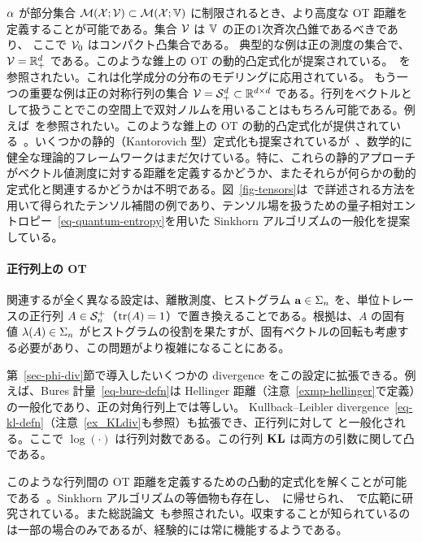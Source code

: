 $\alpha$ が部分集合 $\mathcal{M}(\mathcal{X};\mathcal{V}) \subset \mathcal{M}(\mathcal{X};\mathbb{V})$ に制限されるとき、より高度な OT 距離を定義することが可能である。集合 $\mathcal{V}$ は $\mathbb{V}$ の正の1次斉次凸錐であるべきであり、
ここで $\mathcal{V}_0$ はコンパクト凸集合である。
典型的な例は正の測度の集合で、$\mathcal{V}=\mathbb{R}_+^d$ である。このような錐上の OT の動的凸定式化が提案されている。~\citep{MatthesPositive}を参照されたい。これは化学成分の分布のモデリングに応用されている。
もう一つの重要な例は正の対称行列の集合 $\mathcal{V}=\mathcal{S}_+^d \subset \mathbb{R}^{d \times d}$ である。行列をベクトルとして扱うことでこの空間上で双対ノルムを用いることはもちろん可能である。例えば~\citep{Ning2014metrics}を参照されたい。このような錐上の OT の動的凸定式化が提供されている~\citep{Chen2016,JiangSpectral}。いくつかの静的（Kantorovich 型）定式化も提案されているが~\citep{ning2015matrix,2016-peyre-qot}、数学的に健全な理論的フレームワークはまだ欠けている。特に、これらの静的アプローチがベクトル値測度に対する距離を定義するかどうか、またそれらが何らかの動的定式化と関連するかどうかは不明である。図~\ref{fig-tensors}は~\citep{2016-peyre-qot}で詳述される方法を用いて得られたテンソル補間の例であり、テンソル場を扱うための量子相対エントロピー~\eqref{eq-quantum-entropy}を用いた Sinkhorn アルゴリズムの一般化を提案している。

\paragraph{正行列上の OT}

関連するが全く異なる設定は、離散測度、\ie ヒストグラム $\mathrm{\textbf{a}} \in \Sigma_n$ を、単位トレースの正行列 $A \in \mathcal{S}_n^+$（$\operatorname{tr}(A)=1$）で置き換えることである。根拠は、$A$ の固有値 $\lambda(A) \in \Sigma_n$ がヒストグラムの役割を果たすが、固有ベクトルの回転も考慮する必要があり、この問題がより複雑になることにある。

第~\ref{sec-phi-div}節で導入したいくつかの divergence をこの設定に拡張できる。例えば、Bures 計量~\eqref{eq-bure-defn}は Hellinger 距離（注意~\ref{exmp-hellinger}で定義）の一般化であり、正の対角行列上では等しい。
Kullback--Leibler divergence~\eqref{eq-kl-defn}（注意~\ref{ex_KLdiv}も参照）も拡張でき、正行列に対して
と一般化される。ここで $\log(\cdot)$ は行列対数である。この行列 $\mathrm{\textbf{KL}}$ は両方の引数に関して凸である。

このような行列間の OT 距離を定義するための凸動的定式化を解くことが可能である~\citep{Carlen2014,Chen2016,ChenGangbo17}。Sinkhorn アルゴリズムの等価物も存在し、~\citet{gurvits2004classical}に帰せられ、~\citep{georgiou2015positive}で広範に研究されている。また総説論文~\citep{ReviewSinkhorn}も参照されたい。収束することが知られているのは一部の場合のみであるが、経験的には常に機能するようである。


